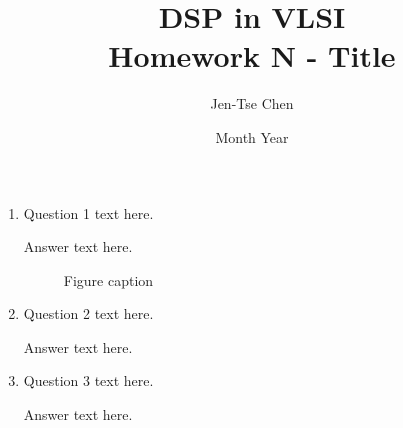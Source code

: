 \documentclass{article}
\title{DSP in VLSI \\ Homework N - Title}
\author{Jen-Tse Chen}
\date{Month Year}
\begin{document}
\maketitle

\begin{enumerate}

    \item Question 1 text here.

    Answer text here.

    \begin{figure}[htbp]
        \centering
        \caption{Figure caption}
        \label{fig:placeholder}
    \end{figure}

    \newpage
    \item Question 2 text here.

    Answer text here.

    \newpage
    \item Question 3 text here.

    Answer text here.

\end{enumerate}
\end{document}
